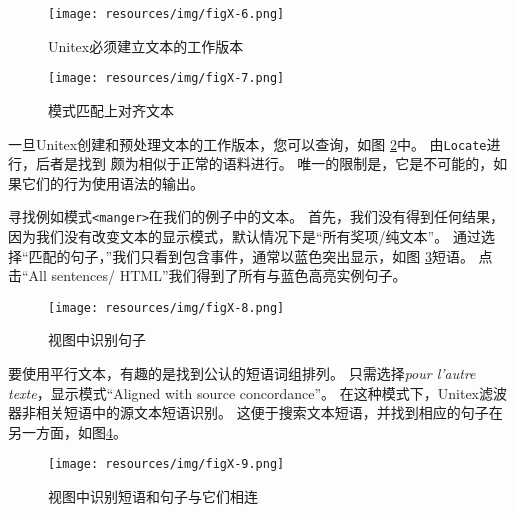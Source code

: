 \begin{figure}[!ht]
\begin{center}
\texttt{[image: resources/img/figX-6.png]}
\caption{Unitex必须建立文本的工作版本\label{fig-x-fig6}}
\end{center}
\end{figure}
 
\begin{figure}[!ht]
\begin{center}
\texttt{[image: resources/img/figX-7.png]}
\caption{模式匹配上对齐文本\label{fig-x-locate-frame}}
\end{center}
\end{figure}

\bigskip
\noindent 一旦Unitex创建和预处理文本的工作版本，您可以查询，如图 \ref{fig-x-locate-frame}中。
由\verb+Locate+进行，后者是找到 颇为相似于正常的语料进行。
唯一的限制是，它是不可能的，如果它们的行为使用语法的输出。


\bigskip
\noindent 寻找例如模式\verb+<manger>+在我们的例子中的文本。
首先，我们没有得到任何结果，因为我们没有改变文本的显示模式，默认情况下是“所有奖项/纯文本”。
通过选择“匹配的句子，”我们只看到包含事件，通常以蓝色突出显示，如图 \ref{fig-x-concord}短语。
点击“All sentences/ HTML”我们得到了所有与蓝色高亮实例句子。

\begin{figure}[!ht]
\begin{center}
\texttt{[image: resources/img/figX-8.png]}
\caption{视图中识别句子\label{fig-x-concord}}
\end{center}
\end{figure}

\bigskip
\noindent 要使用平行文本，有趣的是找到公认的短语词组排列。
只需选择\textit{pour l'autre texte}，显示模式“Aligned with source concordance”。
在这种模式下，Unitex滤波器非相关短语中的源文本短语识别。
这便于搜索文本短语，并找到相应的句子在另一方面，如图\ref{fig-x-concord-aligned}。

\begin{figure}[!ht]
\begin{center}
\texttt{[image: resources/img/figX-9.png]}
\caption{视图中识别短语和句子与它们相连
\label{fig-x-concord-aligned}}
\end{center}
\end{figure}
